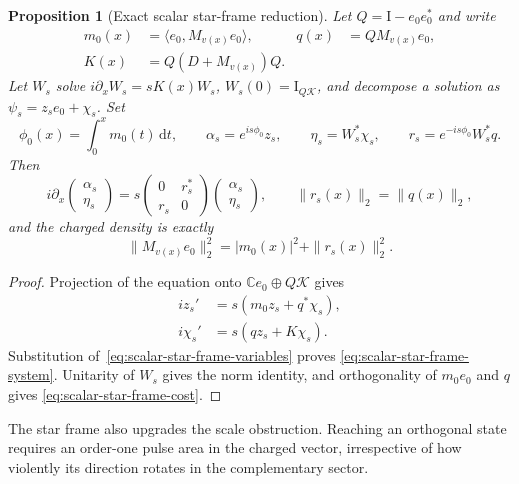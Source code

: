 \documentclass[11pt]{article}
\newcommand{\Id}{\mathrm I}
\newcommand{\dd}{\,\mathrm d}
\newtheorem{proposition}[theorem]{Proposition}
\theoremstyle{definition}
\theoremstyle{remark}
\begin{document}
\begin{proposition}[Exact scalar star-frame reduction]
\label{prop:scalar-star-frame}
Let $Q=\Id-e_0e_0^*$ and write
\begin{equation}
 \begin{aligned}
 m_0(x)&=\langle e_0,M_{v(x)}e_0\rangle,
 &q(x)&=QM_{v(x)}e_0,\\
 K(x)&=Q(D+M_{v(x)})Q.
 \end{aligned}
\end{equation}
Let $W_s$ solve $i\partial_xW_s=sK(x)W_s$, $W_s(0)=\Id_{Q\mathcal K}$,
and decompose a solution as $\psi_s=z_se_0+\chi_s$.  Set
\begin{equation}
 \phi_0(x)=\int_0^xm_0(t)\dd t,
 \qquad \alpha_s=e^{is\phi_0}z_s,
 \qquad \eta_s=W_s^*\chi_s,
 \qquad r_s=e^{-is\phi_0}W_s^*q.
 \label{eq:scalar-star-frame-variables}
\end{equation}
Then
\begin{equation}
 i\partial_x
 \begin{pmatrix}\alpha_s\\ \eta_s\end{pmatrix}
 =s
 \begin{pmatrix}0&r_s^*\\ r_s&0\end{pmatrix}
 \begin{pmatrix}\alpha_s\\ \eta_s\end{pmatrix},
 \qquad
 \|r_s(x)\|_2=\|q(x)\|_2,
 \label{eq:scalar-star-frame-system}
\end{equation}
and the charged density is exactly
\begin{equation}
 \|M_{v(x)}e_0\|_2^2=|m_0(x)|^2+\|r_s(x)\|_2^2.
 \label{eq:scalar-star-frame-cost}
\end{equation}
\end{proposition}

\begin{proof}
Projection of the equation onto $\mathbb Ce_0\oplus Q\mathcal K$ gives
\begin{align}
 iz_s'&=s(m_0z_s+q^*\chi_s),\\
 i\chi_s'&=s(qz_s+K\chi_s).
\end{align}
Substitution of~\eqref{eq:scalar-star-frame-variables} proves
\eqref{eq:scalar-star-frame-system}.  Unitarity of $W_s$ gives the norm
identity, and orthogonality of $m_0e_0$ and $q$ gives
\eqref{eq:scalar-star-frame-cost}.
\end{proof}

The star frame also upgrades the scale obstruction.  Reaching an orthogonal
state requires an order-one pulse area in the charged vector, irrespective of
how violently its direction rotates in the complementary sector.
\end{document}
